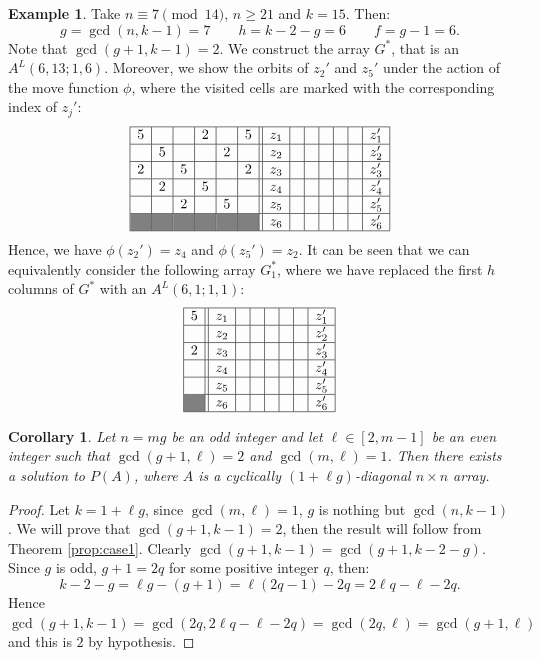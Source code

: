\documentclass{amsart}
\newtheorem{cor}[prop]{Corollary}
\theoremstyle{definition}
\newtheorem{ex}[prop]{Example}
\numberwithin{equation}{section}
\begin{document}
\begin{ex}
Take  $n\equiv7\pmod{14}$, $n \geq 21$ and $k=15$. Then:
\[
g = \gcd(n,k-1) = 7 \qquad h=k-2-g =6  \qquad f =g-1=6.
\]
Note that $\gcd(g+1,k-1)=2$. We construct the array $G^*$, that is an $A^{L}(6,13;1,6)$. Moreover, we show the orbits of $z_2'$ and $z_5'$ under the action of the move function $\phi$, where the visited cells are marked with the corresponding index of $z_j'$:
\[
\begin{array}{|c|c|c|c|c|c||c|c|c|c|c|c|c|} \hline
5&&&2&&5&z_1&&&&&&z_1' \\ \hline
&5&&&2&&z_2&&&&&&z_2' \\ \hline
2&&5&&&2&z_3&&&&&&z_3' \\ \hline
&2&&5&&&z_4&&&&&&z_4' \\ \hline
&&2&&5&&z_5&&&&&&z_5' \\ \hline
\cellcolor{gray}&\cellcolor{gray}&\cellcolor{gray}&\cellcolor{gray}&\cellcolor{gray}&\cellcolor{gray}&z_6&&&&&&z_6' \\ \hline
\end{array}
\]
Hence, we have $\phi(z_2')=z_4$ and $\phi(z_5')=z_2$. It can be seen that we can equivalently consider the following array $G_1^*$, where we have replaced the first $h$ columns of $G^*$ with an $A^{L}(6,1;1,1)$:
\[
\begin{array}{|c||c|c|c|c|c|c|c|} \hline
5&z_1&&&&&&z_1' \\ \hline
&z_2&&&&&&z_2' \\ \hline
2&z_3&&&&&&z_3' \\ \hline
&z_4&&&&&&z_4' \\ \hline
&z_5&&&&&&z_5' \\ \hline
\cellcolor{gray}&z_6&&&&&&z_6' \\ \hline
\end{array}
\]
\end{ex}


\begin{cor} \label{cor:case1}
Let $n=mg$ be an odd integer and let $\ell\in [2,m-1]$ be an even integer such that
 $\gcd(g+1,\ell )=2$ and $\gcd(m,\ell)=1$.
Then there exists a solution to $P(A)$, where $A$ is a cyclically $(1+ \ell g)$-diagonal $n \times n$ array.
\end{cor}
\begin{proof}
Let  $k=1+ \ell g$, since $\gcd(m,\ell)=1$, $g$ is nothing but $\gcd(n,k-1)$.
We will prove that $\gcd(g+1,k-1)=2$, then the result will follow from Theorem \ref{prop:case1}.
Clearly $\gcd(g+1,k-1)=\gcd(g+1,k-2-g)$. Since $g$ is odd,  $g+1=2q$ for some positive integer $q$, then:
\[
k-2-g=\ell g - (g+1) = \ell (2q-1) - 2q = 2 \ell q - \ell - 2q.
\]
Hence $\gcd(g+1,k-1)=\gcd(2q, 2\ell q - \ell - 2q) = \gcd(2q,\ell)=\gcd(g+1,\ell)$ and this is $2$ by hypothesis.
\end{proof}
\end{document}
